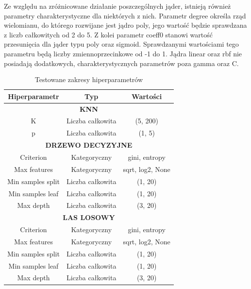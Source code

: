\documentclass[a4paper,twoside,12pt]{book}
\begin{document}
Ze względu na zróżnicowane działanie poszczególnych jąder, istnieją również parametry charakterystyczne dla niektórych z nich. Parametr degree określa rząd wielomianu, do którego rozwijane jest jądro poly, jego wartość będzie sprawdzana z liczb całkowitych od 2 do 5. Z kolei parametr coeff0 stanowi wartość przesunięcia dla jąder typu poly oraz sigmoid. Sprawdzanymi wartościami tego parametru będą liczby zmiennoprzecinkowe od -1 do 1. Jądra linear oraz rbf nie posiadają dodatkowych, charakterystycznych parametrów poza gamma oraz C.
\begin{table}[]
	\centering
	\caption{Testowane zakresy hiperparametrów}
	\label{tab:hiperparametry}
	\begin{tabular}{@{}ccc@{}}
		\toprule
		\textbf{Hiperparametr} & \textbf{Typ}      & \textbf{Wartości}          \\ \midrule
		\multicolumn{3}{c}{\textbf{KNN}}                                        \\ \midrule
		K                      & Liczba całkowita  & (5, 200)                   \\
		p                      & Liczba całkowita  & (1, 5)                     \\ \midrule
		\multicolumn{3}{c}{\textbf{DRZEWO DECYZYJNE}}                           \\ \midrule
		Criterion              & Kategoryczny      & gini, entropy              \\
		Max features           & Kategoryczny      & sqrt, log2, None           \\
		Min samples split      & Liczba całkowita  & (1, 20)                    \\
		Min samples leaf       & Liczba całkowita  & (1, 20)                    \\
		Max depth              & Liczba całkowita  & (3, 20)                    \\ \midrule
		\multicolumn{3}{c}{\textbf{LAS LOSOWY}}                                 \\ \midrule
		Criterion              & Kategoryczny      & gini, entropy              \\
		Max features           & Kategoryczny      & sqrt, log2, None           \\
		Min samples split      & Liczba całkowita  & (1, 20)                    \\
		Min samples leaf       & Liczba całkowita  & (1, 20)                    \\
		Max depth              & Liczba całkowita  & (3, 20)                    \\

\end{tabular}
\end{table}
\end{document}
